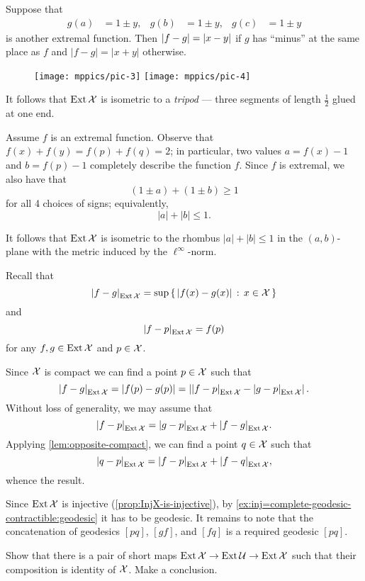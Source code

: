 Suppose that
\begin{align*}
g(a)&=1\pm y,& g(b)&=1\pm y,& g(c)&=1\pm y
\end{align*}
is another extremal function.
Then $|f-g|\z=|x-y|$ if $g$ has ``minus'' at the same place as $f$ and $|f-g|=|x+y|$ otherwise.

\begin{wrapfigure}{o}{30 mm}
\vskip-0mm
\centering
\texttt{[image: mppics/pic-3]}
\bigskip
\texttt{[image: mppics/pic-4]}
\end{wrapfigure}

It follows that $\mathop{\rm Ext}\nolimits\mathcal{X}$ is isometric to a {}\emph{tripod} --- three segments of length $\tfrac12$ glued at one end.

Assume $f$ is an extremal function.
Observe that 
$f(x)+f(y)=f(p)+f(q)=2$;
in particular, two values $a=f(x)-1$ and $b=f(p)-1$ completely describe the function $f$.
Since $f$ is extremal, we also have that 
\[(1\pm a)+(1\pm b)\ge 1\]
for all 4 choices of signs;
equivalently, 
\[|a|+|b|\le 1.\]

It follows that $\mathop{\rm Ext}\nolimits\mathcal{X}$ is isometric to the rhombus $|a|+|b|\le 1$ in the $(a,b)$-plane with the metric induced by the $\ell^\infty$-norm.


Recall that 
\[\dist{f}{g}{\Inj\spc{X}}=\sup\set{|f(x)-g(x)|}{x\in\spc{X}}\]
and 
\[\dist{f}{p}{\Inj\spc{X}}=f(p)\]
for any $f,g\in \mathop{\rm Ext}\nolimits\mathcal{X}$ and $p\in \mathcal{X}$.

Since $\mathcal{X}$ is compact we can find a point $p\in\mathcal{X}$ such that 
\[\dist{f}{g}{\Inj\spc{X}}=|f(p)-g(p)|=\left|\dist{f}{p}{\Inj\spc{X}}-\dist{g}{p}{\Inj\spc{X}}\right|.\]
Without loss of generality, we may assume that 
\[\dist{f}{p}{\Inj\spc{X}}
=
\dist{g}{p}{\Inj\spc{X}}
+
\dist{f}{g}{\Inj\spc{X}}.\]
Applying \ref{lem:opposite-compact}, we can find a point $q\in\mathcal{X}$ such that 
\[\dist{q}{p}{\Inj\spc{X}}
=
\dist{f}{p}{\Inj\spc{X}}
+
\dist{f}{q}{\Inj\spc{X}},\]
whence the result.

Since $\mathop{\rm Ext}\nolimits\mathcal{X}$ is injective (\ref{prop:InjX-is-injective}), by \ref{ex:inj=complete-geodesic-contractible:geodesic} it has to be geodesic. It remains to note that the concatenation of geodesics $[pq]$, $[gf]$, and $[fq]$ is a required geodesic $[pq]$.

Show that there is a pair of short maps 
$\mathop{\rm Ext}\nolimits\mathcal{X}\to\mathop{\rm Ext}\nolimits\mathcal{U}\to\mathop{\rm Ext}\nolimits\mathcal{X}$ 
such that their composition is identity of $\mathcal{X}$.
Make a conclusion.


